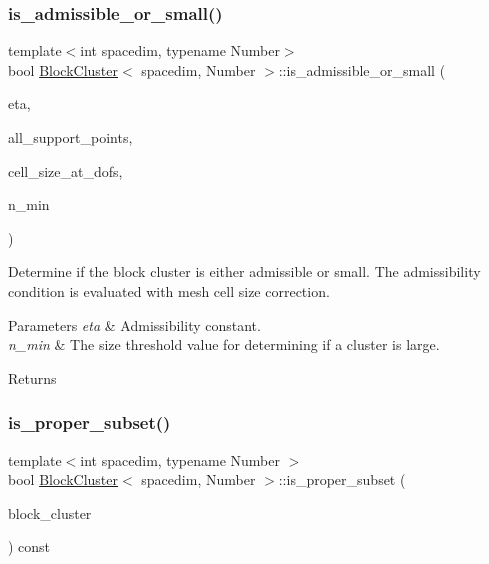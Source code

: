 \subsubsection{\texorpdfstring{is\+\_\+admissible\+\_\+or\+\_\+small()}{is\_admissible\_or\_small()}\hspace{0.1cm}{\footnotesize\ttfamily [2/2]}}
{\footnotesize\ttfamily template$<$int spacedim, typename Number$>$ \\
bool \hyperlink{classBlockCluster}{Block\+Cluster}$<$ spacedim, Number $>$\+::is\+\_\+admissible\+\_\+or\+\_\+small (\begin{DoxyParamCaption}\item[{Number}]{eta,  }\item[{const std\+::vector$<$ Point$<$ spacedim, Number $>$$>$ \&}]{all\+\_\+support\+\_\+points,  }\item[{const std\+::vector$<$ Number $>$ \&}]{cell\+\_\+size\+\_\+at\+\_\+dofs,  }\item[{unsigned int}]{n\+\_\+min }\end{DoxyParamCaption})}

Determine if the block cluster is either admissible or small. The admissibility condition is evaluated with mesh cell size correction.


\begin{DoxyParams}{Parameters}
{\em eta} & Admissibility constant. \\
\hline
{\em n\+\_\+min} & The size threshold value for determining if a cluster is large. \\
\hline
\end{DoxyParams}
\begin{DoxyReturn}{Returns}

\end{DoxyReturn}
\mbox{\label{classBlockCluster_a9963a6320591f82824398667bcb9cdf8}} 
\subsubsection{\texorpdfstring{is\+\_\+proper\+\_\+subset()}{is\_proper\_subset()}}
{\footnotesize\ttfamily template$<$int spacedim, typename Number $>$ \\
bool \hyperlink{classBlockCluster}{Block\+Cluster}$<$ spacedim, Number $>$\+::is\+\_\+proper\+\_\+subset (\begin{DoxyParamCaption}\item[{const \hyperlink{classBlockCluster}{Block\+Cluster}$<$ spacedim, Number $>$ \&}]{block\+\_\+cluster }\end{DoxyParamCaption}) const}

